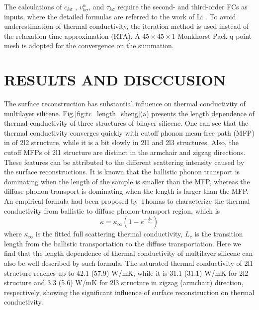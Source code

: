 \documentclass[aps,prb,twocolumn,showpacs,amsmath,amssymb]{revtex4-1}
\begin{document}
The calculations of $c_{k\sigma}$ , $v_{k \sigma}^{\alpha}$, and $\tau_{k\sigma}$ require the second- and third-order FCs as inputs, where the detailed formulas are referred to the work of  Li \cite{Li2014}. To avoid underestimation of thermal conductivity, the iteration method is used instead of the relaxation time approximation (RTA). A $45\times 45 \times 1$ Monkhorst-Pack q-point mesh is adopted for the convergence on the summation.

\section{RESULTS AND DISCCUSION}

The surface reconstruction has substantial influence on thermal conductivity of multilayer silicene.
Fig.\ref{fig:tc_length_sheng}(a) presents the length dependence of thermal conductivity of three structures of bilayer silicene.
One can see that the thermal conductivity converges quickly with cutoff phonon mean free path (MFP) in of 2l2 structure, while it is a bit slowly in 2l1 and 2l3 structures. Also, the cutoff MFPs of 2l1 structure are distinct in the armchair and zigzag directions. These features can be attributed to the different scattering intensity caused by the surface reconstructions.
It is known that the ballistic phonon transport is dominating when the length of the sample is smaller than the MFP,  whereas the diffuse phonon transport is  dominating when the length is larger than the MFP.
An empirical formula had been proposed by Thomas\cite{Thomas2010}  to characterize the thermal conductivity from ballistic to diffuse phonon-transport region, which is
\begin{equation}
  \kappa = \kappa_\infty (1-e^{-\frac{L}{L_c}}) \label{eq:eq_nemd}
\end{equation}
where $\kappa_\infty$ is the fitted full scattering thermal conductivity, $L_c$ is the transition length from the ballistic transportation to the diffuse transportation. Here we find that the length dependence of thermal conductivity of multilayer silicene can also be well described by such formula.
The saturated thermal conductivity of 2l1 structure reaches up to 42.1 (57.9) W/mK, while it is  31.1 (31.1) W/mK  for 2l2 structure and  3.3 (5.6)  W/mK for 2l3 structure in zigzag (armchair) direction, respectively,  showing the significant influence of surface reconstruction on thermal conductivity.
\end{document}
